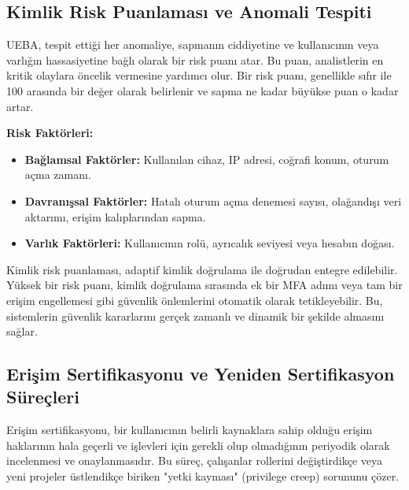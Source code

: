 \subsection{Kimlik Risk Puanlaması ve Anomali Tespiti}

UEBA, tespit ettiği her anomaliye, sapmanın ciddiyetine ve kullanıcının veya varlığın hassasiyetine bağlı olarak bir risk puanı atar. Bu puan, analistlerin en kritik olaylara öncelik vermesine yardımcı olur. Bir risk puanı, genellikle sıfır ile 100 arasında bir değer olarak belirlenir ve sapma ne kadar büyükse puan o kadar artar.

\textbf{Risk Faktörleri:}
\begin{itemize}
    \item \textbf{Bağlamsal Faktörler:} Kullanılan cihaz, IP adresi, coğrafi konum, oturum açma zamanı.
    \item \textbf{Davranışsal Faktörler:} Hatalı oturum açma denemesi sayısı, olağandışı veri aktarımı, erişim kalıplarından sapma.
    \item \textbf{Varlık Faktörleri:} Kullanıcının rolü, ayrıcalık seviyesi veya hesabın doğası.
\end{itemize}

Kimlik risk puanlaması, adaptif kimlik doğrulama ile doğrudan entegre edilebilir. Yüksek bir risk puanı, kimlik doğrulama sırasında ek bir MFA adımı veya tam bir erişim engellemesi gibi güvenlik önlemlerini otomatik olarak tetikleyebilir. Bu, sistemlerin güvenlik kararlarını gerçek zamanlı ve dinamik bir şekilde almasını sağlar.

\subsection{Erişim Sertifikasyonu ve Yeniden Sertifikasyon Süreçleri}

Erişim sertifikasyonu, bir kullanıcının belirli kaynaklara sahip olduğu erişim haklarının hala geçerli ve işlevleri için gerekli olup olmadığının periyodik olarak incelenmesi ve onaylanmasıdır. Bu süreç, çalışanlar rollerini değiştirdikçe veya yeni projeler üstlendikçe biriken "yetki kayması" (privilege creep) sorununu çözer.

